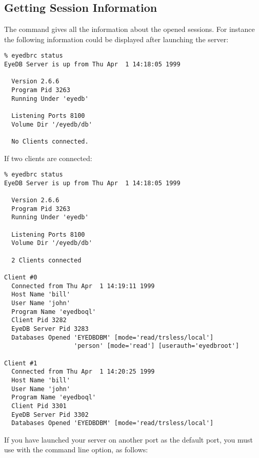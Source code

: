 \subsection{Getting Session Information}
The command  gives all the information about the
opened sessions. For instance the following information could be displayed
after launching the server:
\verbsize\begin{verbatim}
% eyedbrc status
EyeDB Server is up from Thu Apr  1 14:18:05 1999
 
  Version 2.6.6
  Program Pid 3263
  Running Under 'eyedb'
 
  Listening Ports 8100
  Volume Dir '/eyedb/db'
 
  No Clients connected.
\end{verbatim}\normalsize
If two  clients are connected:
\verbsize\begin{verbatim}
% eyedbrc status
EyeDB Server is up from Thu Apr  1 14:18:05 1999
 
  Version 2.6.6
  Program Pid 3263
  Running Under 'eyedb'
 
  Listening Ports 8100
  Volume Dir '/eyedb/db'
 
  2 Clients connected
 
Client #0
  Connected from Thu Apr  1 14:19:11 1999
  Host Name 'bill'
  User Name 'john'
  Program Name 'eyedboql'
  Client Pid 3282
  EyeDB Server Pid 3283
  Databases Opened 'EYEDBDBM' [mode='read/trsless/local']
                   'person' [mode='read'] [userauth='eyedbroot']
 
Client #1
  Connected from Thu Apr  1 14:20:25 1999
  Host Name 'bill'
  User Name 'john'
  Program Name 'eyedboql'
  Client Pid 3301
  EyeDB Server Pid 3302
  Databases Opened 'EYEDBDBM' [mode='read/trsless/local']
\end{verbatim}\normalsize
If you have launched your server on another port as the default port,
you must use  with the  command line option,
as follows:\\

